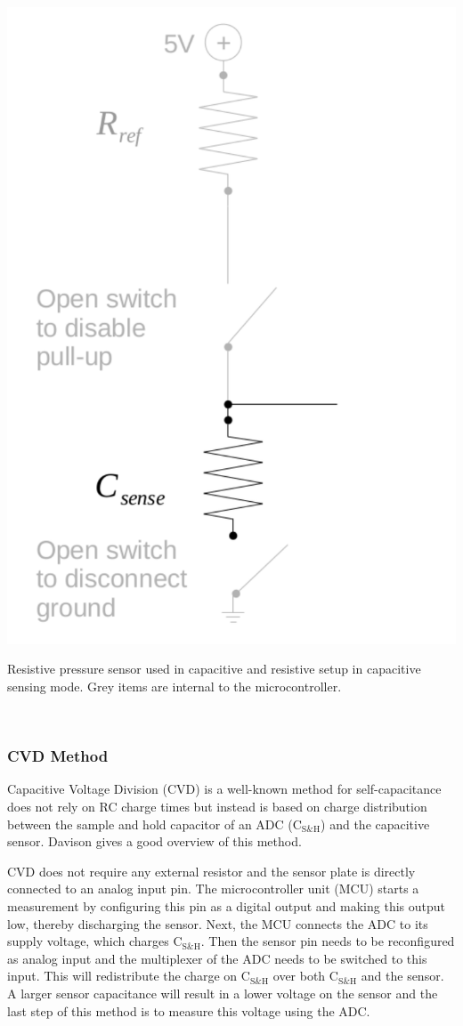 \documentclass{sigchi-ext}
\begin{document}
\begin{marginfigure}
\begin{minipage}{\marginparwidth}
\centering
\includegraphics[width=0.75\columnwidth]{figures/cap_res_setup_cap}
\caption{Resistive pressure sensor used in capacitive and resistive setup in
capacitive sensing mode. Grey items are internal to the
microcontroller.}~\label{fig:cap_res_setup_cap}
\end{minipage}
\end{marginfigure}


\subsubsection{CVD Method}
Capacitive Voltage Division (CVD) is a well-known method for self-capacitance does not rely on RC charge times
but instead is based on charge distribution between the sample and hold capacitor
of an ADC ($\textrm{C}_{\textrm{S\&H}}$) and the capacitive sensor. Davison \cite{Davison2013a} gives a
good overview of this method.

CVD does not require any external resistor and the sensor plate is directly connected to an analog input pin.  The microcontroller unit (MCU) starts a
measurement by configuring this pin as a digital output and making this output low,
thereby discharging the sensor. Next, the MCU connects the 
ADC to its supply voltage, which charges $\textrm{C}_{\textrm{S\&H}}$.
Then the sensor pin needs to be reconfigured as analog input and the
multiplexer of the ADC needs to be switched to this input. This will
redistribute the charge on $\textrm{C}_{\textrm{S\&H}}$ over both
$\textrm{C}_{\textrm{S\&H}}$ and the sensor. A larger sensor
capacitance will result in a lower voltage on the sensor and the last step of
this method is to measure this voltage using the ADC.
\end{document}
